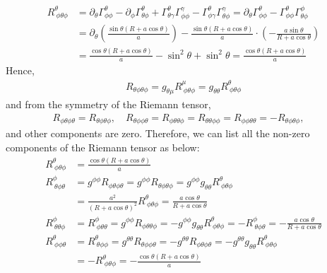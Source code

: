 \documentclass[12pt]{article}
\begin{document}
\begin{align}
R^{\theta}_{~\phi \theta \phi} &= \partial_{\theta} \Gamma^{\theta}_{\phi \phi} - \partial_{\phi} \Gamma^{\theta}_{\theta \phi} + \Gamma^{\theta}_{\theta \gamma} \Gamma^{\gamma}_{\phi \phi} - \Gamma^{\theta}_{\phi \gamma} \Gamma^{\gamma}_{\theta \phi} = \partial_{\theta} \Gamma^{\theta}_{\phi \phi} - \Gamma^{\theta}_{\phi \phi} \Gamma^{\phi}_{\theta \phi}\\
&= \partial_{\theta} \left(\frac{\sin{\theta} \left( R + a \cos{\theta}\right)}{a}\right) - \frac{\sin{\theta} \left( R + a \cos{\theta}\right)}{a} \cdot \left( - \frac{a \sin{\theta}}{R + a \cos{\theta}} \right) \nonumber \\
&= \frac{\cos{\theta} \left( R + a \cos{\theta}\right)}{a} - \sin^2{\theta} + \sin^2{\theta} = \frac{\cos{\theta} \left( R + a \cos{\theta}\right)}{a}
\end{align}
Hence,
\begin{align}
R_{\theta \phi \theta \phi} = g_{\theta \mu}R^{\mu}_{~\phi \theta \phi} = g_{\theta \theta}R^{\theta}_{~\phi \theta \phi}
\end{align}
and from the symmetry of the Riemann tensor,
\begin{align}
R_{\phi \theta \phi \theta} = R_{\theta \phi \theta \phi}, \quad R_{\theta \phi \phi \theta} = R_{\phi \theta \theta \phi} = R_{\theta \theta \phi \phi} = R_{\phi \phi \theta \theta} = - R_{\theta \phi \theta \phi}, \quad 
\end{align}
and other components are zero. Therefore, we can list all the non-zero components of the Riemann tensor as below:
\begin{align}
R^{\theta}_{~\phi \theta \phi} &= \frac{\cos{\theta} \left( R + a \cos{\theta}\right)}{a} \\
R^{\phi}_{~\theta \phi \theta} &= g^{\phi \phi} R_{\phi \theta \phi \theta} = g^{\phi \phi} R_{\theta \phi \theta \phi} = g^{\phi \phi} g_{\theta \theta}R^{\theta}_{~\phi \theta \phi}\\
&= \frac{a^2}{\left( R + a \cos{\theta}\right)^2} R^{\theta}_{~\phi \theta \phi} = \frac{a \cos{\theta}}{R + a \cos{\theta}}\\
R^{\phi}_{~\theta \theta \phi} &= R^{\phi}_{~\phi \theta \theta} = g^{\phi \phi} R_{\phi \theta \theta \phi} = - g^{\phi \phi} g_{\theta \theta}R^{\theta}_{~\phi \theta \phi} = - R^{\phi}_{~\theta \phi \theta} = - \frac{a \cos{\theta}}{R + a \cos{\theta}} \\
R^{\theta}_{~\phi \phi \theta} &= R^{\theta}_{~\theta \phi \phi} = g^{\theta \theta} R_{\theta \phi \phi \theta} = - g^{\theta \theta} R_{\phi \theta \phi \theta} = - g^{\theta \theta} g_{\theta \theta} R^{\theta}_{~\phi \theta \phi} \nonumber \\
&= - R^{\theta}_{~\phi \theta \phi} = - \frac{\cos{\theta} \left( R + a \cos{\theta}\right)}{a}
\end{align}
\end{document}
